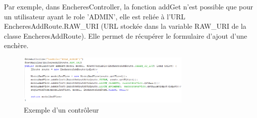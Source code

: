 		\noindent
		Par exemple, dans EncheresController, la fonction addGet n'est possible que pour un utilisateur ayant le role 'ADMIN', elle est reliée à l'URL EncheresAddRoute.RAW\_URI (URL stockée dans la variable RAW\_URI de la classe EncheresAddRoute). Elle permet de récupérer le formulaire d'ajout d'une enchère.

		\begin{figure}[H]
			\centering\includegraphics[width=0.75\textwidth, keepaspectratio]{res/enchereController.png}
			\caption{Exemple d'un contrôleur}
		\end{figure}
